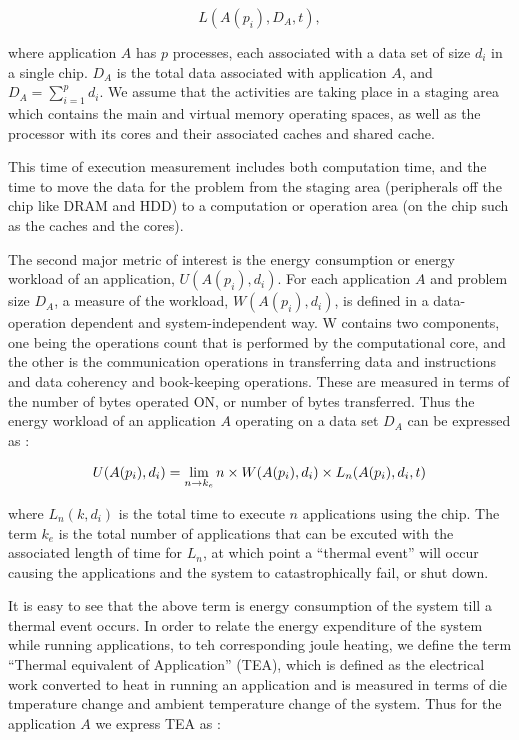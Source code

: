 \documentclass[]{sig-alternate-hotpower09}
\begin{document}
\[
L(A(p_i),D_A,t),
\]

where application $A$ has $p$ processes, each associated with a data set
of size $d_i$ in a single chip. $D_A$ is the total data associated with
application $A$, and $D_A = \sum_{i=1}^p{d_i}$.  We assume that the
activities are taking place in a staging area which contains the main
and virtual memory operating spaces, as well as the processor with its
cores and their associated caches and shared cache.

This time of execution measurement includes both computation time, and
the time to move the data for the problem from the staging area
(peripherals off the chip like DRAM and HDD) to a computation or
operation area (on the chip such as the caches and the cores).

The second major metric of interest is the energy consumption or energy
workload of an application, $U(A(p_i),d_i)$. For each application $A$
and problem size $D_A$, a measure of the workload, $W(A(p_i),d_i)$, is
defined in a data-operation dependent and system-independent way. W
contains two components, one being the operations count that is
performed by the computational core, and the other is the communication
operations in transferring data and instructions and data coherency and
book-keeping operations. These are measured in terms of the number of
bytes operated ON, or number of bytes transferred. Thus the energy
workload of an application $A$ operating on a data set $D_A$ can be
expressed as :

\[
U(A(p_i),d_i) = \displaystyle \lim_{n \to k_e }n \times W(A(p_i),d_i) \times L_n(A(p_i),d_i,t) \\
\]

where $L_n(k, d_i)$ is the total time to execute $n$ applications using
the chip. The term $k_e$ is the total number of applications that can be
excuted with the associated length of time for $L_n$, at which point a
``thermal event'' will occur causing the applications and the system to
catastrophically fail, or shut down.

It is easy to see that the above term is energy consumption of the
system till a thermal event occurs. In order to relate the energy
expenditure of the system while running applications, to teh
corresponding joule heating, we define the term ``Thermal equivalent of
Application'' (TEA), which is defined as the electrical work converted
to heat in running an application and is measured in terms of die
tmperature change and ambient temperature change of the system. Thus for
the application $A$ we express TEA as :
\end{document}
